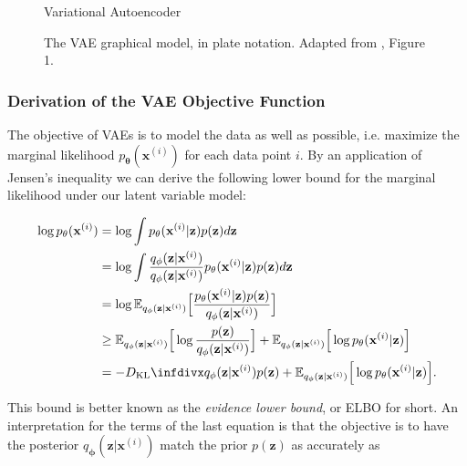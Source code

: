 \begin{figure}[!htb]
  \centering
  \resizebox{\textwidth}{!}{\unskip}
  \caption{Variational Autoencoder}
  \label{fig:vae}
\end{figure}

\begin{figure}[!htb]
  \centering
  \resizebox{0.3\textwidth}{!}{\unskip}
  \caption{The VAE graphical model, in plate notation. Adapted from \cite{aevb}, Figure 1.}
  \label{fig:aevb_plate_notation}
\end{figure}

\newcommand{\ptheta}{p_{\mathbf{\theta}}}
\newcommand{\qphi}{q_{\mathbf{\phi}}}
\newcommand{\bxi}{\mathbf{x}^{(i)}}
\newcommand{\bz}{\mathbf{z}}

\subsubsection{Derivation of the VAE Objective Function}

The objective of VAEs is to model the data as well as possible, i.e. maximize the marginal likelihood $\ptheta(\bxi)$ for each data point $i$. By an application of Jensen's inequality we can derive the following lower bound for the marginal likelihood under our latent variable model:

\begin{equation}
\begin{aligned}
\log \ptheta(\bxi) & = \log \int \ptheta(\bxi \vert \bz) p(\bz) d\bz \\
                   & = \log \int \frac{\qphi(\bz \vert \bxi)}{\qphi(\bz \vert \bxi)} \ptheta(\bxi \vert \bz) p(\bz) d\bz \\
                   & = \log \mathbb{E}_{\qphi(\bz \vert \bxi)}\Big[\frac{\ptheta(\bxi \vert \bz) p(\bz)}{\qphi(\bz \vert \bxi)}\Big] \\
                   & \geq \mathbb{E}_{\qphi(\bz \vert \bxi)}\Big[\log \frac{p(\bz)}{\qphi(\bz \vert \bxi)}\Big] + \mathbb{E}_{\qphi(\bz \vert \bxi)}\Big[\log \ptheta(\bxi \vert \bz)\Big] \\
                   & = -\dkl{\qphi(\bz \vert \bxi)}{p(\bz)} + \mathbb{E}_{\qphi(\bz \vert \bxi)}\Big[\log \ptheta(\bxi \vert \bz)\Big].
\end{aligned}
\end{equation}

This bound is better known as the \textit{evidence lower bound}, or ELBO for short. An interpretation for the terms of the last equation is that the objective is to have the posterior $\qphi(\bz \vert \bxi)$ match the prior $p(\bz)$ as accurately as 

